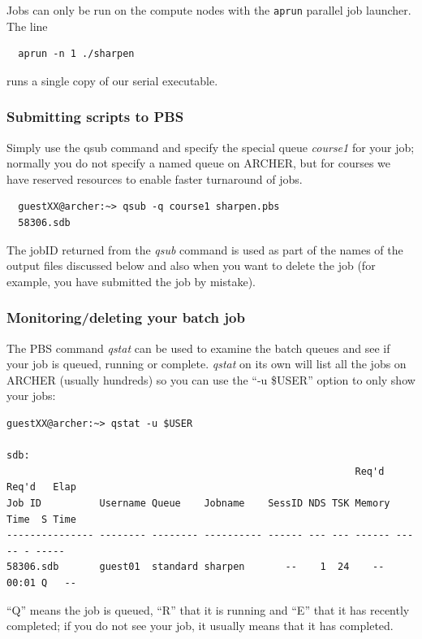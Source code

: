 \documentclass{article}
\begin{document}
Jobs can only be run on the compute nodes with the {\verb+aprun+}
parallel job launcher. The line
\begin{verbatim}
  aprun -n 1 ./sharpen
\end{verbatim}

runs a single copy of our serial executable.

\subsubsection{Submitting scripts to PBS}
\label{sec-3-7-2}

Simply use the qsub command and specify the special queue {\em
  course1} for your job; normally you do not specify a named queue on
ARCHER, but for courses we have reserved resources to enable faster
turnaround of jobs.


\begin{verbatim}
  guestXX@archer:~> qsub -q course1 sharpen.pbs
  58306.sdb
\end{verbatim}

The jobID returned from the \emph{qsub} command is used as part of the
names of the output files discussed below and also when you want to
delete the job (for example, you have submitted the job by mistake).

\subsubsection{Monitoring/deleting your batch job}
\label{sec-3-7-3}


The PBS command \emph{qstat} can be used to examine the batch queues and
see if your job is queued, running or complete. \emph{qstat} on its own
will list all the jobs on ARCHER (usually hundreds) so you can use the
``-u \$USER'' option to only show your jobs:


\begin{verbatim}
guestXX@archer:~> qstat -u $USER

sdb:
                                                            Req'd  Req'd   Elap
Job ID          Username Queue    Jobname    SessID NDS TSK Memory Time  S Time
--------------- -------- -------- ---------- ------ --- --- ------ ----- - -----
58306.sdb       guest01  standard sharpen       --    1  24    --  00:01 Q   --
\end{verbatim}

``Q'' means the job is queued, ``R'' that it is running and ``E'' that
it has recently completed; if you do not see your job, it usually
means that it has completed.
\end{document}

